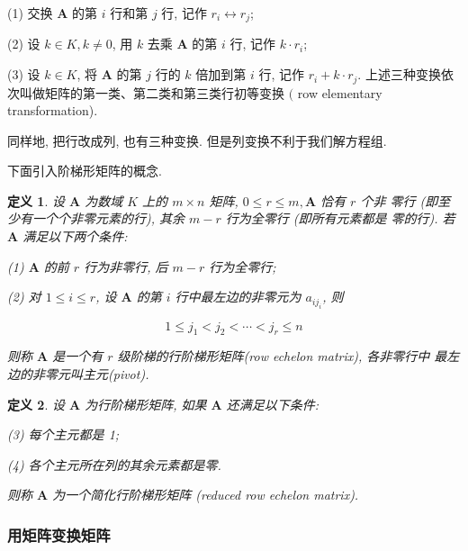 \documentclass{article}
\newtheorem{mydef}{定义}
\begin{document}
(1) 交换 $\boldsymbol{A}$ 的第 $i$ 行和第 $j$ 行, 记作 $r_{i} \longleftrightarrow r_{j}$;

(2) 设 $k \in K, k \neq 0$, 用 $k$ 去乘 $\boldsymbol{A}$ 的第 $i$ 行, 记作 $k \cdot r_{i}$;

(3) 设 $k \in K$, 将 $\boldsymbol{A}$ 的第 $j$ 行的 $k$ 倍加到第 $i$ 行, 记作 $r_{i}+k \cdot r_{j}$. 上述三种变换依次叫做矩阵的第一类、第二类和第三类行初等变换 $($ row elementary transformation).

同样地, 把行改成列, 也有三种变换. 但是列变换不利于我们解方程组.

下面引入阶梯形矩阵的概念.

\begin{mydef}设 $\boldsymbol{A}$ 为数域 $K$ 上的 $m \times n$ 矩阵, $0 \leq r \leq m, \boldsymbol{A}$ 恰有 $r$ 个非 零行 (即至少有一个个非零元素的行), 其余 $m-r$ 行为全零行 (即所有元素都是 零的行). 若 $\boldsymbol{A}$ 满足以下两个条件:

(1) $\boldsymbol{A}$ 的前 $r$ 行为非零行, 后 $m-r$ 行为全零行;

(2) 对 $1 \leq i \leq r$, 设 $\boldsymbol{A}$ 的第 $i$ 行中最左边的非零元为 $a_{i j_{i}}$, 则

$$
1 \leq j_{1}<j_{2}<\cdots<j_{r} \leq n
$$

则称 $\boldsymbol{A}$ 是一个有 $r$ 级阶梯的行阶梯形矩阵(row echelon matrix), 各非零行中 最左边的非零元叫主元(pivot).
\end{mydef}

\begin{mydef}设 $\boldsymbol{A}$ 为行阶梯形矩阵, 如果 $\boldsymbol{A}$ 还满足以下条件:

(3) 每个主元都是 1;

(4) 各个主元所在列的其余元素都是零.

则称 $\boldsymbol{A}$ 为一个简化行阶梯形矩阵 (reduced row echelon matrix).
\end{mydef}

\subsubsection{用矩阵变换矩阵}
\end{document}
